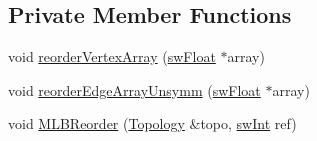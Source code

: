 \subsection*{Private Member Functions}
\begin{DoxyCompactItemize}
\item 
void \hyperlink{classMultiLevelBlockIterator_a184e9a87ccff9f3eb2c5960434175936}{reorderVertexArray} (\hyperlink{swMacro_8h_a4ce60b1aa82e56b7372553a6a5bf2c0b}{swFloat} $\ast$array)
\item 
void \hyperlink{classMultiLevelBlockIterator_a2c8b4ee175d96866d03cf0196312a4ea}{reorderEdgeArrayUnsymm} (\hyperlink{swMacro_8h_a4ce60b1aa82e56b7372553a6a5bf2c0b}{swFloat} $\ast$array)
\item 
void \hyperlink{classMultiLevelBlockIterator_a40f5b13a4c39c42b035c7bf4b72e8edb}{MLBReorder} (\hyperlink{classTopology}{Topology} \&topo, \hyperlink{swMacro_8h_a113cf5f6b5377cdf3fac6aa4e443e9aa}{swInt} ref)
\end{DoxyCompactItemize}

